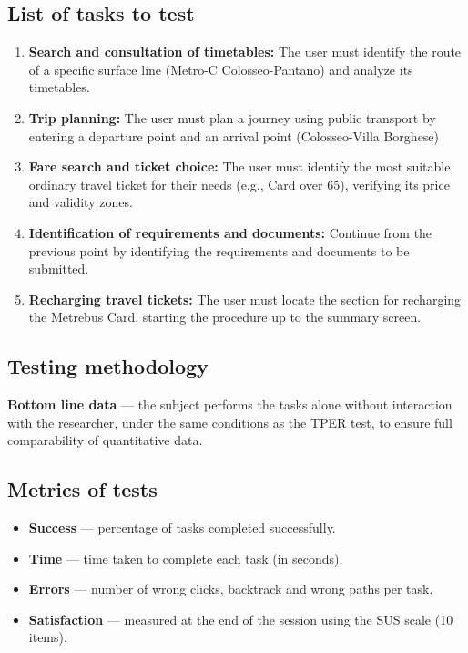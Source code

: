 ﻿\documentclass[11pt,a4paper]{article}
\begin{document}
\vspace{0.4cm}

\subsection*{List of tasks to test}
\begin{tcolorbox}[base]
\begin{enumerate}[leftmargin=*,itemsep=4pt]
  \item \textbf{Search and consultation of timetables:} The user
  must identify the route of a specific surface line (Metro-C Colosseo-Pantano) and analyze its timetables.
  \item \textbf{Trip planning:} The user
  must plan a journey using public transport by entering a departure point and
  an arrival point (Colosseo-Villa Borghese)
  \item \textbf{Fare search and ticket choice:}
  The user must identify the most suitable ordinary travel ticket
  for their needs (e.g., Card over 65),
  verifying its price and validity zones.
  \item \textbf{Identification of requirements and documents:}
  Continue from the previous point by identifying the requirements and documents
  to be submitted.
  \item \textbf{Recharging travel tickets:}
  The user must locate the section for recharging the Metrebus Card,
  starting the procedure up to the summary screen.
\end{enumerate}
\end{tcolorbox}

\vspace{0.4cm}

\subsection*{Testing methodology}
\textbf{Bottom line data} --- the
subject performs the tasks alone without interaction with
the researcher, under the same conditions as the TPER test,
to ensure full comparability of quantitative data.

\vspace{0.2cm}

\subsection*{Metrics of tests}
\begin{itemize}[leftmargin=*,itemsep=3pt]
  \item \textbf{Success} --- percentage of tasks completed
  successfully.
  \item \textbf{Time} --- time taken to
  complete each task (in seconds).
  \item \textbf{Errors} --- number of wrong clicks,
  backtrack and wrong paths per task.
  \item \textbf{Satisfaction} --- measured at the end of the session
  using the SUS scale (10 items).
\end{itemize}
\end{document}

